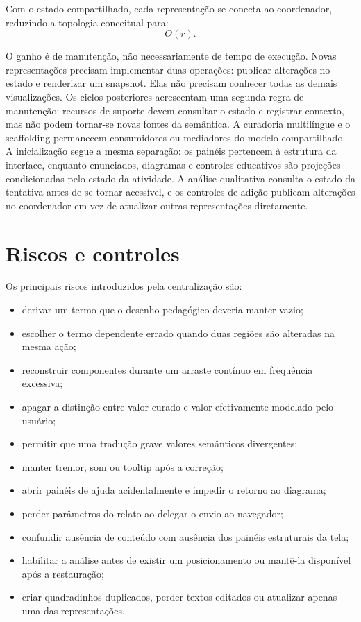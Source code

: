 \documentclass[12pt,a4paper]{article}
\begin{document}
Com o estado compartilhado, cada representação se conecta ao coordenador, reduzindo a topologia conceitual para:
\[
O(r).
\]

O ganho é de manutenção, não necessariamente de tempo de execução. Novas representações precisam implementar duas operações: publicar alterações no estado e renderizar um snapshot. Elas não precisam conhecer todas as demais visualizações. Os ciclos posteriores acrescentam uma segunda regra de manutenção: recursos de suporte devem consultar o estado e registrar contexto, mas não podem tornar-se novas fontes da semântica. A curadoria multilíngue e o scaffolding permanecem consumidores ou mediadores do modelo compartilhado. A inicialização segue a mesma separação: os painéis pertencem à estrutura da interface, enquanto enunciados, diagramas e controles educativos são projeções condicionadas pelo estado da atividade. A análise qualitativa consulta o estado da tentativa antes de se tornar acessível, e os controles de adição publicam alterações no coordenador em vez de atualizar outras representações diretamente.

\section{Riscos e controles}

Os principais riscos introduzidos pela centralização são:
\begin{itemize}[noitemsep]
  \item derivar um termo que o desenho pedagógico deveria manter vazio;
  \item escolher o termo dependente errado quando duas regiões são alteradas na mesma ação;
  \item reconstruir componentes durante um arraste contínuo em frequência excessiva;
  \item apagar a distinção entre valor curado e valor efetivamente modelado pelo usuário;
  \item permitir que uma tradução grave valores semânticos divergentes;
  \item manter tremor, som ou tooltip após a correção;
  \item abrir painéis de ajuda acidentalmente e impedir o retorno ao diagrama;
  \item perder parâmetros do relato ao delegar o envio ao navegador;
  \item confundir ausência de conteúdo com ausência dos painéis estruturais da tela;
  \item habilitar a análise antes de existir um posicionamento ou mantê-la disponível após a restauração;
  \item criar quadradinhos duplicados, perder textos editados ou atualizar apenas uma das representações.
\end{itemize}
\end{document}
